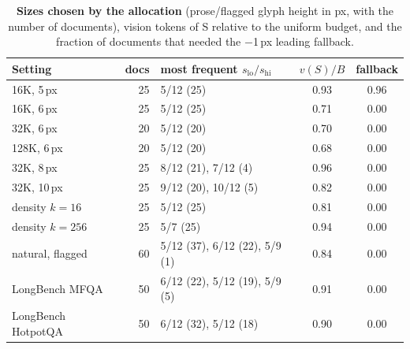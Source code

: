 \begin{table}[!htbp]
\centering
\caption{\textbf{Sizes chosen by the allocation} (prose/flagged glyph height in px, with the number of documents), vision tokens of S relative to the uniform budget, and the fraction of documents that needed the $-$1\,px leading fallback.}
\label{tab:app_alloc}
\footnotesize
\setlength{\tabcolsep}{3pt}
\begin{tabular}{l r l c c}
\toprule
Setting & docs & most frequent $s_{\mathrm{lo}}/s_{\mathrm{hi}}$ & $v(S)/B$ & fallback \\
\midrule
16K, 5\,px & 25 & 5/12 (25) & 0.93 & 0.96 \\
16K, 6\,px & 25 & 5/12 (25) & 0.71 & 0.00 \\
32K, 6\,px & 20 & 5/12 (20) & 0.70 & 0.00 \\
128K, 6\,px & 20 & 5/12 (20) & 0.68 & 0.00 \\
32K, 8\,px & 25 & 8/12 (21), 7/12 (4) & 0.96 & 0.00 \\
32K, 10\,px & 25 & 9/12 (20), 10/12 (5) & 0.82 & 0.00 \\
density $k{=}16$ & 25 & 5/12 (25) & 0.81 & 0.00 \\
density $k{=}256$ & 25 & 5/7 (25) & 0.94 & 0.00 \\
natural, flagged & 60 & 5/12 (37), 6/12 (22), 5/9 (1) & 0.84 & 0.00 \\
LongBench MFQA & 50 & 6/12 (22), 5/12 (19), 5/9 (5) & 0.91 & 0.00 \\
LongBench HotpotQA & 50 & 6/12 (32), 5/12 (18) & 0.90 & 0.00 \\
\bottomrule
\end{tabular}
\end{table}
